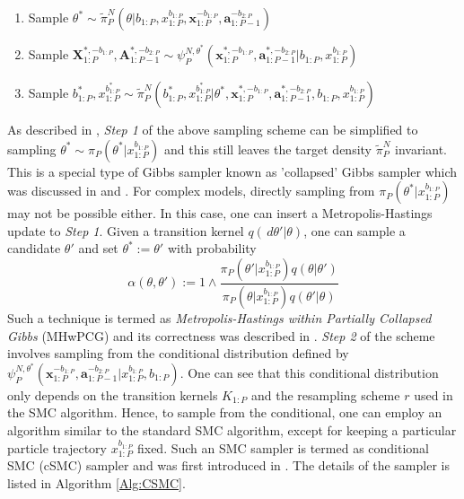 \documentclass[12pt,a4paper]{article}
\begin{document}
\begin{enumerate}[label=\textit{Step \arabic*.},leftmargin=*]
    \item Sample $\theta^{*} \sim \tilde{\pi}_P^N\left(\theta|b_{1:P},x_{1:P}^{b_{1:P}},\textbf{x}_{1:P}^{-b_{1:P}},\textbf{a}_{1:P-1}^{-b_{2:P}}\right)$ 
    \item Sample $\textbf{X}_{1:P}^{*,-b_{1:P}},\textbf{A}_{1:P-1}^{*,-b_{2:P}} \sim \psi_P^{N,\theta^{*}}\left(\textbf{x}_{1:P}^{*,-b_{1:P}},\textbf{a}_{1:P-1}^{*,-b_{2:P}}|b_{1:P},x_{1:P}^{b_{1:P}}\right)$
    \item Sample $b_{1:P}^{*},x_{1:P}^{b_{1:P}^{*}} \sim \tilde{\pi}_P^N\left(b_{1:P}^{*},x_{1:P}^{b_{1:P}^{*}}|\theta^{*},\textbf{x}_{1:P}^{*,-b_{1:P}},\textbf{a}_{1:P-1}^{*,-b_{2:P}},b_{1:P},x_{1:P}^{b_{1:P}}\right)$
\end{enumerate}

As described in \cite{andrieu2010particle}, \textit{Step 1} of the above sampling scheme can be simplified to sampling $\theta^{*} \sim \pi_P(\theta^{*}|x_{1:P}^{b_{1:P}})$ and this still leaves the target density $\tilde{\pi}_P^N$ invariant. This is a special type of Gibbs sampler known as 'collapsed' Gibbs sampler which was discussed in \cite{liu2001monte} and \cite{van2008partially}. For complex models, directly sampling from \(\pi_P(\theta^{*}|x_{1:P}^{b_{1:P}})\) may not be possible either. In this case, one can insert a Metropolis-Hastings update to \textit{Step 1}. Given a transition kernel \(q(\,d\theta'|\theta)\), one can sample a candidate \(\theta'\) and set \(\theta^{*} := \theta'\) with probability 
\[
    \alpha(\theta,\theta') := 1 \wedge  \frac{\pi_P(\theta'|x_{1:P}^{b_{1:P}})q(\theta|\theta')}{\pi_P(\theta|x_{1:P}^{b_{1:P}})q(\theta'|\theta)} 
\]
Such a technique is termed as \textit{Metropolis-Hastings within Partially Collapsed Gibbs} (MHwPCG) and its correctness was described in \cite{van2008partially}. \textit{Step 2} of the scheme involves sampling from the conditional distribution defined by \(\psi_{P}^{N,\theta^{*}}\left(\mathbf{x}_{1:P}^{-b_{1:P}},\mathbf{a}_{1:P-1}^{-b_{2:P}}|x_{1:P}^{b_{1:P}},b_{1:P}\right)\). One can see that this conditional distribution only depends on the transition kernels $K_{1:P}$ and the resampling scheme $r$ used in the SMC algorithm. Hence, to sample from the conditional, one can employ an algorithm similar to the standard SMC algorithm, except for keeping a particular particle trajectory \(x_{1:P}^{b_{1:P}}\) fixed. Such an SMC sampler is termed as conditional SMC (cSMC) sampler and was first introduced in \cite{andrieu2010particle}. The details of the sampler is listed in Algorithm \ref{Alg:CSMC}.
\end{document}
